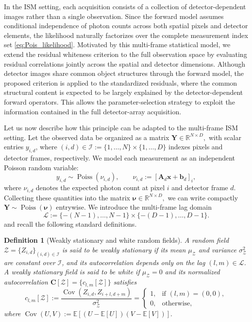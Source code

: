\documentclass[letterpaper]{article}
\newtheorem{definition}{Definition}
\begin{document}
In the ISM setting, each acquisition consists of a collection of detector-dependent images rather than a single observation. Since the forward model assumes conditional independence of photon counts across both spatial pixels and detector elements, the likelihood naturally factorizes over the complete measurement index set \eqref{eq:Pois_likelihood}. Motivated by this multi-frame statistical model, we extend the residual whiteness criterion to the full observation space by evaluating residual correlations jointly across the spatial and detector dimensions. Although detector images share common object structures through the forward model, the proposed criterion is applied to the standardized residuals, where the common structural content is expected to be largely explained by the detector-dependent forward operators. This allows the parameter-selection strategy to exploit the information contained in the full detector-array acquisition.


Let us now describe how this principle can be adapted to the multi-frame ISM setting. Let the observed data be organized as a matrix
$
\mathbf{Y}\in\mathbb{R}^{N\times D},
$
with scalar entries $y_{i,d}$, where
$
(i,d)\in\mathcal I
:=
\{1,\dots,N\}\times\{1,\dots,D\}
$
indexes pixels and detector frames, respectively. We model each measurement as an independent Poisson random variable:
\begin{equation}
y_{i,d}
\sim
\operatorname{Poiss}(\nu_{i,d}),
\qquad
\nu_{i,d}
:=
[\mathbf A_d\mathbf x+\mathbf b_d]_i,
\end{equation}
where $\nu_{i,d}$ denotes the expected photon count at pixel $i$ and detector frame $d$. Collecting these quantities into the matrix
$
\boldsymbol\nu\in\mathbb R^{N\times D},
$
we can write compactly
$
\mathbf Y \sim \operatorname{Poiss}(\boldsymbol\nu)
$
entrywise.
We introduce the multi-frame  lag domain
\[
\mathcal L
:=
\{-(N-1),\dots,N-1\}
\times
\{-(D-1),\dots,D-1\}.
\]
and recall the following standard definitions.

\begin{definition}[Weakly stationary and white random fields]
A random field
$
\mathcal Z
=
\{Z_{i,d}\}_{(i,d)\in\mathcal I}
$
is said to be \emph{weakly stationary} if its mean $\mu_{\mathcal Z}$ and variance $\sigma_{\mathcal Z}^2$ are constant over $\mathcal I$, and its autocorrelation depends only on the lag $(l,m)\in\mathcal L$.
A weakly stationary field is said to be \emph{white} if $\mu_{\mathcal Z}=0$ and its normalized autocorrelation
$
\mathbf C[\mathcal Z]
=
\{c_{l,m}[\mathcal Z]\}
$
satisfies
\begin{equation}
\label{eq:autocorr}
c_{l,m}[\mathcal Z]
:=
\frac{
\operatorname{Cov}(Z_{i,d},Z_{i+l,d+m})
}{
\sigma_{\mathcal Z}^2
}
=
\begin{cases}
1,
& \text{if } (l,m)=(0,0),\\
0,
& \text{otherwise},
\end{cases}
\end{equation}
where
$
\operatorname{Cov}(U,V)
:=
\mathbb E[(U-\mathbb E[U])(V-\mathbb E[V])].
$
\end{definition}
\end{document}
